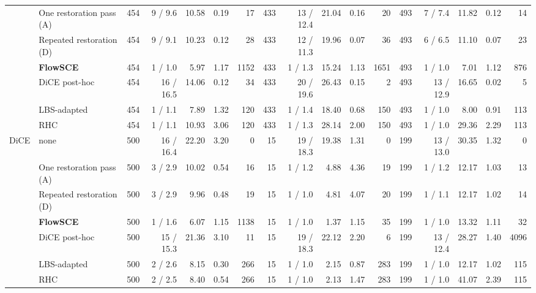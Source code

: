 \begin{table}[t]
{\begin{tabular}{@{}llrrrrrrrrrrrrrrr@{}}
 & One restoration pass (A) & 454 & 9 / 9.6 & 10.58 & 0.19 & 17 & 433 & 13 / 12.4 & 21.04 & 0.16 & 20 & 493 & 7 / 7.4 & 11.82 & 0.12 & 14 \\
 & Repeated restoration (D) & 454 & 9 / 9.1 & 10.23 & 0.12 & 28 & 433 & 12 / 11.3 & 19.96 & 0.07 & 36 & 493 & 6 / 6.5 & 11.10 & 0.07 & 23 \\
 & \textbf{FlowSCE} & 454 & 1 / 1.0 & 5.97 & 1.17 & 1152 & 433 & 1 / 1.3 & 15.24 & 1.13 & 1651 & 493 & 1 / 1.0 & 7.01 & 1.12 & 876 \\
 & DiCE post-hoc & 454 & 16 / 16.5 & 14.06 & 0.12 & 34 & 433 & 20 / 19.6 & 26.43 & 0.15 & 2 & 493 & 13 / 12.9 & 16.65 & 0.02 & 5 \\
 & LBS-adapted & 454 & 1 / 1.1 & 7.89 & 1.32 & 120 & 433 & 1 / 1.4 & 18.40 & 0.68 & 150 & 493 & 1 / 1.0 & 8.00 & 0.91 & 113 \\
 & RHC & 454 & 1 / 1.1 & 10.93 & 3.06 & 120 & 433 & 1 / 1.3 & 28.14 & 2.00 & 150 & 493 & 1 / 1.0 & 29.36 & 2.29 & 113 \\
\midrule
DiCE & none & 500 & 16 / 16.4 & 22.20 & 3.20 & 0 & 15 & 19 / 18.3 & 19.38 & 1.31 & 0 & 199 & 13 / 13.0 & 30.35 & 1.32 & 0 \\
 & One restoration pass (A) & 500 & 3 / 2.9 & 10.02 & 0.54 & 16 & 15 & 1 / 1.2 & 4.88 & 4.36 & 19 & 199 & 1 / 1.2 & 12.17 & 1.03 & 13 \\
 & Repeated restoration (D) & 500 & 3 / 2.9 & 9.96 & 0.48 & 19 & 15 & 1 / 1.0 & 4.81 & 4.07 & 20 & 199 & 1 / 1.1 & 12.17 & 1.02 & 14 \\
 & \textbf{FlowSCE} & 500 & 1 / 1.6 & 6.07 & 1.15 & 1138 & 15 & 1 / 1.0 & 1.37 & 1.15 & 35 & 199 & 1 / 1.0 & 13.32 & 1.11 & 32 \\
 & DiCE post-hoc & 500 & 15 / 15.3 & 21.36 & 3.10 & 11 & 15 & 19 / 18.3 & 22.12 & 2.20 & 6 & 199 & 13 / 12.4 & 28.27 & 1.40 & 4096 \\
 & LBS-adapted & 500 & 2 / 2.6 & 8.15 & 0.30 & 266 & 15 & 1 / 1.0 & 2.15 & 0.87 & 283 & 199 & 1 / 1.0 & 12.17 & 1.02 & 115 \\
 & RHC & 500 & 2 / 2.5 & 8.40 & 0.54 & 266 & 15 & 1 / 1.0 & 2.13 & 1.47 & 283 & 199 & 1 / 1.0 & 41.07 & 2.39 & 115 \\
\bottomrule
\end{tabular}}
\end{table}
